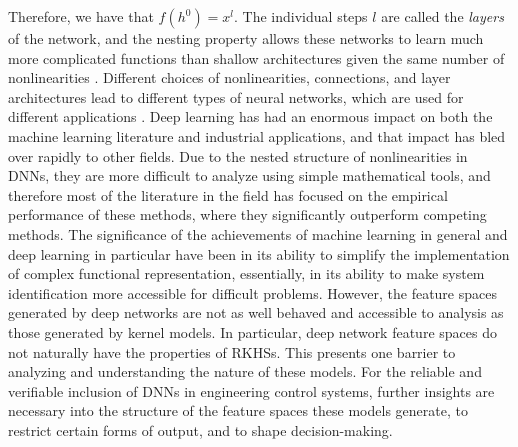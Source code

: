 Therefore, we have that $f(h^0) = x^l$. 
The individual steps $l$ are called the \emph{layers} of the network, and the nesting property allows these networks to learn much more complicated functions than shallow architectures given the same number of nonlinearities 
\cite{bengio2009learning}. Different choices of nonlinearities, connections, and layer architectures lead to different types of neural networks, which are used for different applications \cite{goodfellow2016deep}. Deep learning has had an enormous impact on both the machine learning literature and industrial applications, and that impact has bled over rapidly to other fields. Due to the nested structure of nonlinearities in DNNs, they are more difficult to analyze using simple mathematical tools, and therefore most of the literature in the field has focused on the empirical performance of these methods, where they significantly outperform competing methods.  The significance of the achievements of machine learning in general and deep learning in particular have been in its ability to simplify the implementation of complex functional representation, essentially, in its ability to make system identification more accessible for difficult problems. However, the feature spaces generated by deep networks are not as well behaved and accessible to analysis as those generated by kernel models. In particular, deep network feature spaces do not naturally have the properties of RKHSs.  This presents one barrier to analyzing and understanding the nature of these models. For the reliable and verifiable inclusion of DNNs in engineering control systems, %
further insights are necessary into the structure of the feature spaces
these models generate, to restrict certain forms of output, and to shape decision-making. 

